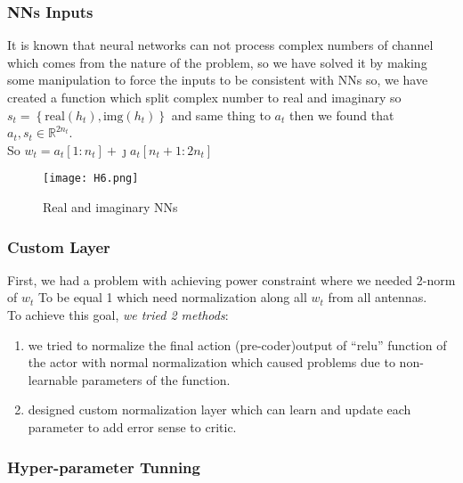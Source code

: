 \subsubsection{NNs Inputs}
It is known that neural networks can not process complex numbers of channel which comes from the nature of the problem, so we have solved it by making some manipulation to force the inputs to be consistent with NNs so, we have created a function which split complex number to real and imaginary so $s_t=\left\{\text{real}\left(h_t\right),\text{img}(h_t)\right\}$ and same thing to $a_t$ then we found that $a_t, s_t \in \mathbb{R}^{2n_t}$. \\
So $w_t=a_t\left[1:n_t\right]+\jmath a_t[n_t+1:2n_t]$
\begin{figure}[ht]
    \centering
    \texttt{[image: H6.png]}
    \caption{Real and imaginary NNs}
    \label{fig:real and img}
\end{figure}

\subsubsection{Custom Layer}
First, we had a problem with achieving power constraint where we needed 2-norm of $w_t$ To be equal 1 which need normalization along all $w_t$ from all antennas. \\
To achieve this goal, \emph{we tried 2 methods}:
\begin{enumerate}
    \item we tried to normalize the final action (pre-coder)output of “relu” function of the actor with normal normalization which caused problems due to non-learnable parameters of the function.
    \item designed custom normalization layer which can learn and update each parameter to add error sense to critic.
\end{enumerate}

\subsubsection{Hyper-parameter Tunning}

